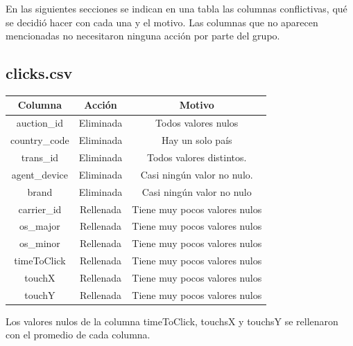 \documentclass{article}
\begin{document}
En las siguientes secciones se indican en una tabla las columnas conflictivas, qué se decidió hacer con cada una y el motivo. Las columnas que no aparecen mencionadas no necesitaron ninguna acción por parte del grupo.

\subsection{clicks.csv}

\FloatBarrier
\begin{center}
        \begin{tabular}{ |c|c|c| }
          \hline
          Columna & Acción & Motivo \\
          \hline\hline
          auction\_id & Eliminada & Todos valores nulos \\
          \hline
          country\_code & Eliminada & Hay un solo país \\
          \hline
          trans\_id & Eliminada & Todos valores distintos. \\
          \hline
          agent\_device & Eliminada & Casi ningún valor no nulo. \\
          \hline
          brand & Eliminada & Casi ningún valor no nulo \\
          \hline
          carrier\_id & Rellenada & Tiene muy pocos valores nulos \\
          \hline
          os\_major & Rellenada & Tiene muy pocos valores nulos \\
          \hline
          os\_minor & Rellenada & Tiene muy pocos valores nulos \\
          \hline
          timeToClick & Rellenada & Tiene muy pocos valores nulos \\
          \hline
          touchX & Rellenada & Tiene muy pocos valores nulos \\
          \hline
          touchY & Rellenada & Tiene muy pocos valores nulos \\
          \hline
        \end{tabular}
\end{center}
\FloatBarrier
Los valores nulos de la columna timeToClick, touchsX y touchsY se rellenaron con el promedio de cada columna.
\end{document}
